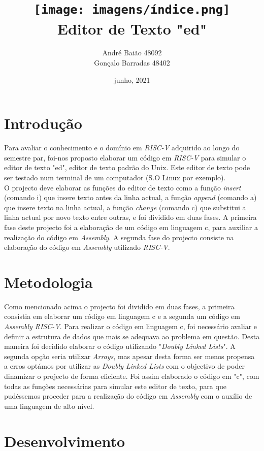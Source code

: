 \documentclass[letterpaper,12pt]{article}
\title{\texttt{[image: imagens/índice.png]}
\\ [0.9cm] Editor de Texto "ed"}
\author{André Baião 48092\\Gonçalo Barradas 48402}
\date{junho, 2021}
\begin{document}
\section{Introdução}
\onehalfspacing 
\large 
Para avaliar o conhecimento e o domínio em \emph{RISC-V} adquirido ao longo do semestre par, foi-nos proposto elaborar um código em \emph{RISC-V} para simular o editor de texto "ed", editor de texto padrão do Unix. Este editor de texto pode ser testado num terminal de um computador (S.O Linux por exemplo).\\
O projecto deve elaborar as funções do editor de texto como a função \emph{insert} (comando i) que insere texto antes da linha actual, a função \emph{append} (comando a) que insere texto na linha actual, a função \emph{change} (comando c) que substitui a linha actual por novo texto entre outras, e foi dividido em duas fases.\newline
A primeira fase deste projecto foi a elaboração de um código em linguagem c, para auxiliar a realização do código em \emph{Assembly}.
A segunda fase do projecto consiste na elaboração do código em \emph{Assembly} utilizado \emph{RISC-V}.
\vspace{1,5cm}


\section{Metodologia}

Como mencionado acima o projecto foi dividido em duas fases, a primeira consistia em elaborar um código em linguagem c e a segunda um código em \emph{Assembly RISC-V}.
Para realizar o código em linguagem c, foi necessário avaliar e definir a estrutura de dados que mais se adequava ao problema em questão. Desta maneira foi decidido elaborar o código utilizando "\emph{Doubly Linked Lists}". A segunda opção seria utilizar \emph{Arrays}, mas apesar desta forma ser menos propensa a erros optámos por utilizar as \emph{Doubly Linked Lists} com o objectivo de poder dinamizar o projecto de forma eficiente.
Foi assim elaborado o código em "c", com todas as funções necessárias para simular este editor de texto, para que pudéssemos proceder para a realização do código em \emph{Assembly} com o auxílio de uma linguagem de alto nível.\vspace{1,5cm}

\newpage
\section{Desenvolvimento}
\end{document}
